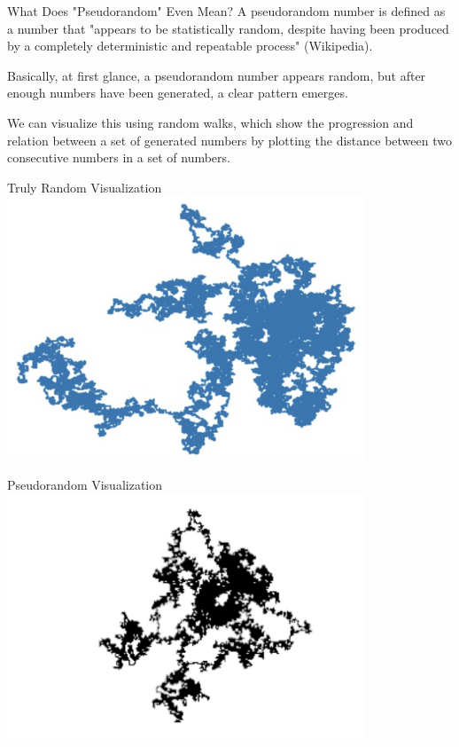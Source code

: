\documentclass[aspectratio=169]{beamer}
\begin{document}
\begin{frame}{What Does "Pseudorandom" Even Mean?}
  A pseudorandom number is defined as a number that "appears to be statistically random, despite having been produced by a completely deterministic and repeatable process" (Wikipedia). \pause

  Basically, at first glance, a pseudorandom number appears random, but after enough numbers have been generated, a clear pattern emerges. \pause

  We can visualize this using random walks, which show the progression and relation between a set of generated numbers by plotting the distance between two consecutive numbers in a set of numbers.
\end{frame}

\begin{frame}{Truly Random Visualization}
\includegraphics[width=0.8\textwidth]{random.png}
\end{frame}

\begin{frame}{Pseudorandom Visualization}
\includegraphics[width=0.8\textwidth]{pseudorandom.png}
\end{frame}
\end{document}
